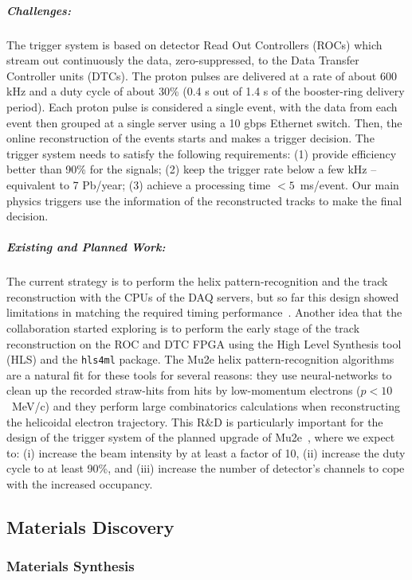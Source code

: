 \subparagraph*{Challenges:} The trigger system is based on detector Read Out Controllers (ROCs) which stream out continuously the data, zero-suppressed, to the Data Transfer Controller units (DTCs). The proton pulses are delivered at a rate of about 600 kHz and a duty cycle of about 30\% (0.4 s out of 1.4 s of the booster-ring delivery period). Each proton pulse is considered a single event, with the data from each event then grouped at a single server using a 10 gbps Ethernet switch. Then, the online reconstruction of the events starts and makes a trigger decision.  The trigger system needs to satisfy the following requirements: (1)  provide efficiency better than 90\% for the signals; (2)  keep the trigger rate below a few kHz -- equivalent to 7 Pb/year; (3) achieve a processing time $<5$~ms/event. Our main physics triggers use the information of the reconstructed tracks to make the final decision.  

\subparagraph*{Existing and Planned Work:} The current strategy is to perform the helix pattern-recognition and the track reconstruction with the CPUs of the DAQ servers, but so far this design showed limitations in matching the required timing performance~\cite{pezzullo_gianantonio_2020_4088480}. Another idea that the collaboration started exploring is to perform the early stage of the track reconstruction on the ROC and DTC FPGA using the High Level Synthesis tool (HLS) and the \texttt{hls4ml} package. The Mu2e helix pattern-recognition algorithms~\cite{pezzullo_gianantonio_2020_4088480} are a natural fit for these tools for several reasons: they use neural-networks to clean up the recorded straw-hits from hits by low-momentum electrons ($p<10$~MeV/c) and they perform large combinatorics calculations when reconstructing the helicoidal electron trajectory. This R\&D is particularly important for the design of the trigger system of the planned upgrade of Mu2e~\cite{abusalma2018expression}, where we expect to: (i) increase the beam intensity by at least a factor of 10, (ii) increase the duty cycle to at least 90\%, and (iii) increase the number of detector's channels to cope with the increased occupancy.


\subsection{Materials Discovery}
\subsubsection{Materials Synthesis}

